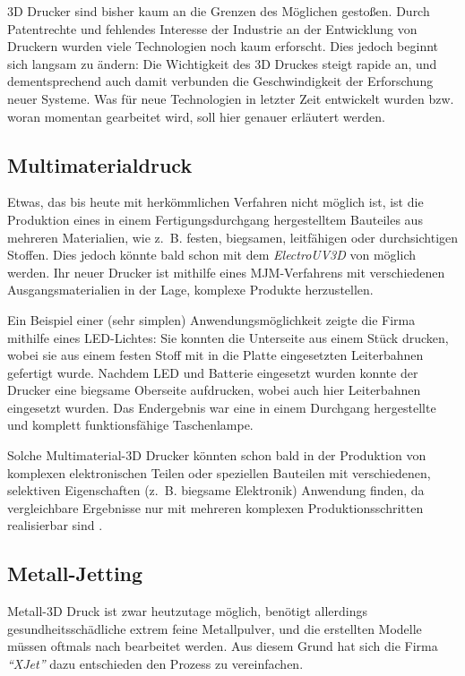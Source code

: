 3D Drucker sind bisher kaum an die Grenzen des Möglichen gestoßen. Durch Patentrechte und fehlendes Interesse der Industrie an der Entwicklung von Druckern wurden viele Technologien noch kaum erforscht. Dies jedoch beginnt sich langsam zu ändern: Die Wichtigkeit des 3D Druckes steigt rapide an, und dementsprechend auch damit verbunden die Geschwindigkeit der Erforschung neuer Systeme. Was für neue Technologien in letzter Zeit entwickelt wurden bzw. woran momentan gearbeitet wird, soll hier genauer erläutert werden.

\subsection{Multimaterialdruck}
Etwas, das bis heute mit herkömmlichen Verfahren nicht möglich ist, ist die Produktion eines in einem Fertigungsdurchgang hergestelltem Bauteiles aus mehreren Materialien, wie z.~B. festen, biegsamen, leitfähigen oder durchsichtigen Stoffen. Dies jedoch könnte bald schon mit dem \emph{ElectroUV3D} von  möglich werden. Ihr neuer Drucker ist mithilfe eines MJM-Verfahrens mit verschiedenen Ausgangsmaterialien in der Lage, komplexe Produkte herzustellen. 

Ein Beispiel einer (sehr simplen) Anwendungsmöglichkeit zeigte die Firma mithilfe eines LED-Lichtes: Sie konnten die Unterseite aus einem Stück drucken, wobei sie aus einem festen Stoff mit in die Platte eingesetzten Leiterbahnen gefertigt wurde. Nachdem LED und Batterie eingesetzt wurden konnte der Drucker eine biegsame Oberseite aufdrucken, wobei auch hier Leiterbahnen eingesetzt wurden. Das Endergebnis war eine in einem Durchgang hergestellte und komplett funktionsfähige Taschenlampe.

Solche Multimaterial-3D Drucker könnten schon bald in der Produktion von komplexen elektronischen Teilen oder speziellen Bauteilen mit verschiedenen, selektiven Eigenschaften (z.~B. biegsame Elektronik) Anwendung finden, da vergleichbare Ergebnisse nur mit mehreren komplexen Produktionsschritten realisierbar sind \parencite{Multimaterial}.

\subsection{Metall-Jetting}
Metall-3D Druck ist zwar heutzutage möglich, benötigt allerdings gesundheitsschädliche extrem feine Metallpulver, und die erstellten Modelle müssen oftmals nach bearbeitet werden. Aus diesem Grund hat sich die Firma \emph{\textquotedblleft XJet\textquotedblright} dazu entschieden den Prozess zu vereinfachen. 

